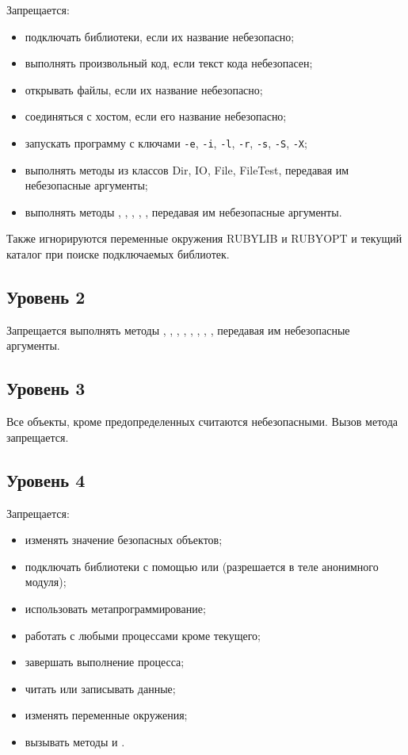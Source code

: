 Запрещается:
\begin{itemize}
  \item подключать библиотеки, если их название небезопасно;
  \item выполнять произвольный код, если текст кода небезопасен;
  \item открывать файлы, если их название небезопасно;
  \item соединяться с хостом, если его название небезопасно;
  \item запускать программу с ключами \verb!-e!, \verb!-i!, \verb!-l!, \verb!-r!, \verb!-s!, \verb!-S!, \verb!-X!;
  \item выполнять методы из классов Dir, IO, File, FileTest, передавая им небезопасные аргументы;
  \item выполнять методы , , , , , передавая им небезопасные аргументы.
\end{itemize}
 
Также игнорируются переменные окружения RUBYLIB и RUBYOPT и текущий каталог при поиске подключаемых библиотек.

\subsection{Уровень 2}

Запрещается выполнять методы , , , , , , , ,  передавая им небезопасные аргументы.

\subsection{Уровень 3}

Все объекты, кроме предопределенных считаются небезопасными. Вызов метода  запрещается.

\subsection{Уровень 4}

Запрещается:
\begin{itemize}
  \item изменять значение безопасных объектов;
  \item подключать библиотеки с помощью  или  (разрешается в теле анонимного модуля);
  \item использовать метапрограммирование;
  \item работать с любыми процессами кроме текущего;
  \item завершать выполнение процесса;
  \item читать или записывать данные;
  \item изменять переменные окружения;
  \item вызывать методы  и .
\end{itemize}

